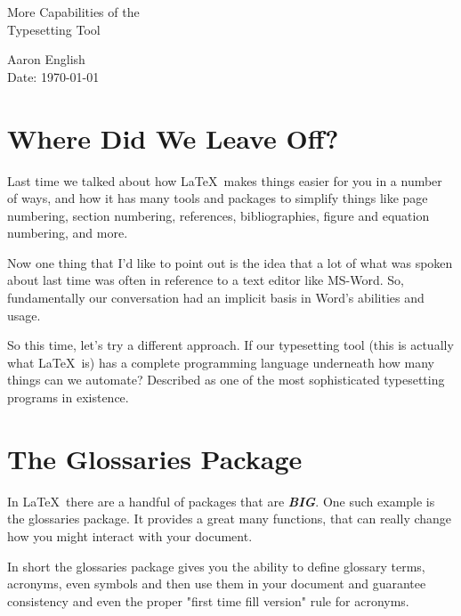 \documentclass[hidelinks, float=false, crop=false]{article}
\begin{document}
{}
    \begin{center}
        \vspace*{1cm}
        {\fontsize{30}{50}\selectfont {\bfseries Hello Again \LaTeX\\}}
        \vspace{3cm}
        {\LARGE More Capabilities of the\\
        Typesetting Tool\\}
        \vspace{7cm}
    \end{center}
    \begin{raggedleft}
        {\Large Aaron English\\
            Date: \today\\}
    \end{raggedleft}
    \thispagestyle{empty}

    \clearpage
    \tableofcontents
    \clearpage
    \section{Where Did We Leave Off?}
        Last time we talked about how \LaTeX~makes things easier for you in a number of ways, and 
        how it has many tools and packages to simplify things like page numbering, section numbering,
        references, bibliographies, figure and equation numbering, and more. 

        Now one thing that I'd like to point out is the idea that a lot of what was spoken about
        last time was often in reference to a text editor like MS-Word. So, fundamentally our 
        conversation had an implicit basis in Word's abilities and usage. 

        So this time, let's try a different approach. If our typesetting tool (this is actually what
        \LaTeX~is) has a complete programming language underneath how many things can we automate?
        Described as one of the most sophisticated typesetting programs in existence.

    \section{The Glossaries Package}
        In \LaTeX~there are a handful of packages that are \textbf{\textit{BIG}}. One such example
        is the glossaries package. It provides a great many functions, that can really change how
        you might interact with your document. 

        In short the glossaries package gives you the ability to define glossary terms, acronyms, 
        even symbols and then use them in your document and guarantee consistency and even the proper
        "first time fill version" rule for acronyms.
\end{document}
